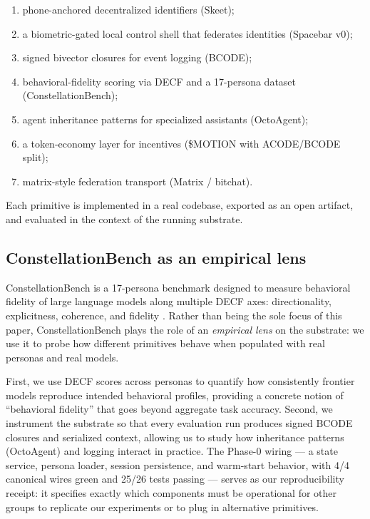 \begin{enumerate}
\def\labelenumi{\arabic{enumi}.}
\tightlist
\item
  phone-anchored decentralized identifiers (Skeet);
\item
  a biometric-gated local control shell that federates identities
  (Spacebar v0);
\item
  signed bivector closures for event logging (BCODE);
\item
  behavioral-fidelity scoring via DECF and a 17-persona dataset
  (ConstellationBench);
\item
  agent inheritance patterns for specialized assistants (OctoAgent);
\item
  a token-economy layer for incentives (\$MOTION with ACODE/BCODE
  split);
\item
  matrix-style federation transport (Matrix / bitchat).
\end{enumerate}

Each primitive is implemented in a real codebase, exported as an open
artifact, and evaluated in the context of the running substrate.

\subsection{ConstellationBench as an empirical
lens}\label{constellationbench-as-an-empirical-lens}

ConstellationBench is a 17-persona benchmark designed to measure
behavioral fidelity of large language models along multiple DECF axes:
directionality, explicitness, coherence, and fidelity
\citep{constellationbench2026}. Rather than being the sole focus of this
paper, ConstellationBench plays the role of an \emph{empirical lens} on
the substrate: we use it to probe how different primitives behave when
populated with real personas and real models.

First, we use DECF scores across personas to quantify how consistently
frontier models reproduce intended behavioral profiles, providing a
concrete notion of ``behavioral fidelity'' that goes beyond aggregate
task accuracy. Second, we instrument the substrate so that every
evaluation run produces signed BCODE closures and serialized context,
allowing us to study how inheritance patterns (OctoAgent) and logging
interact in practice. The Phase-0 wiring --- a state service, persona
loader, session persistence, and warm-start behavior, with 4/4 canonical
wires green and 25/26 tests passing --- serves as our reproducibility
receipt: it specifies exactly which components must be operational for
other groups to replicate our experiments or to plug in alternative
primitives.

